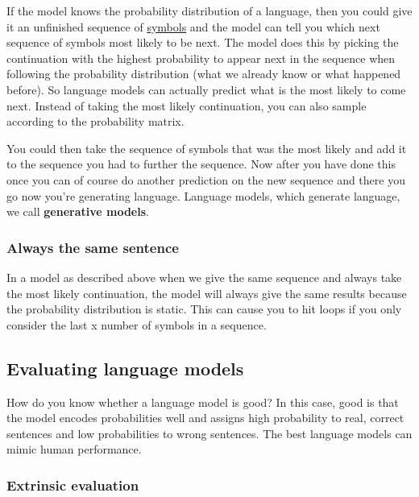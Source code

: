 \documentclass[
  11pt,
  british,
]{article}
\begin{document}
If the model knows the probability distribution of a language, then you
could give it an unfinished sequence of
\href{../Data/Symbol.md}{symbols} and the model can tell you which next
sequence of symbols most likely to be next. The model does this by
picking the continuation with the highest probability to appear next in
the sequence when following the probability distribution (what we
already know or what happened before). So language models can actually
predict what is the most likely to come next. Instead of taking the most
likely continuation, you can also sample according to the probability
matrix.

You could then take the sequence of symbols that was the most likely and
add it to the sequence you had to further the sequence. Now after you
have done this once you can of course do another prediction on the new
sequence and there you go now you're generating language. Language
models, which generate language, we call \textbf{generative models}.

\hypertarget{always-the-same-sentence}{%
\subsubsection{Always the same
sentence}\label{always-the-same-sentence}}

In a model as described above when we give the same sequence and always
take the most likely continuation, the model will always give the same
results because the probability distribution is static. This can cause
you to hit loops if you only consider the last x number of symbols in a
sequence.

\hypertarget{evaluating-language-models}{%
\subsection{Evaluating language
models}\label{evaluating-language-models}}

How do you know whether a language model is good? In this case, good is
that the model encodes probabilities well and assigns high probability
to real, correct sentences and low probabilities to wrong sentences. The
best language models can mimic human performance.

\hypertarget{extrinsic-evaluation-1}{%
\subsubsection{Extrinsic evaluation}\label{extrinsic-evaluation-1}}
\end{document}
